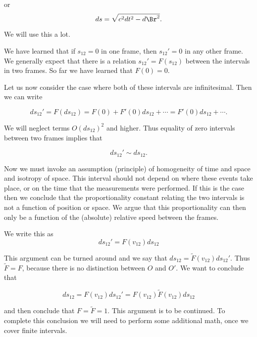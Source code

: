 or
\begin{equation}\label{eqn:relativisticElectrodynamicsL2:60b}
ds= \sqrt{c^2 dt^2 - d\Br^2}.
\end{equation}

We will use this a lot.

We have learned that if \(s_{12} = 0\) in one frame, then \(s_{12}' = 0\) in any other frame.  We generally expect that there is a relation \(s_{12}' = F(s_12)\) between the intervals in two frames.  So far we have learned that \(F(0) = 0\). 

Let us now consider the case where both of these intervals are infinitesimal.  Then we can write

\begin{equation}\label{eqn:relativisticElectrodynamicsL2:70}
ds_{12}' = F(ds_{12}) = F(0) + F'(0) ds_{12} + \cdots = F'(0) ds_{12} + \cdots.
\end{equation}

We will neglect terms \(O(ds_{12})^2\) and higher.  Thus equality of zero intervals between two frames implies that 

\begin{equation}\label{eqn:relativisticElectrodynamicsL2:80}
ds_{12}' \sim ds_{12}.
\end{equation}

Now we must invoke an assumption (principle) of homogeneity of time and space and isotropy of space.  This interval should not depend on where these events take place, or on the time that the measurements were performed.  If this is the case then we conclude that the proportionality constant relating the two intervals is not a function of position or space.  We argue that this proportionality can then only be a function of the (absolute) relative speed between the frames.

We write this as
\begin{equation}\label{eqn:relativisticElectrodynamicsL2:90}
ds_{12}' = F(v_{12}) ds_{12}
\end{equation}

This argument can be turned around and we say that \(ds_{12} = \tilde{F}(v_{12}) ds_{12}'\).  Thus \(\tilde{F} = F\), because there is no distinction between \(O\) and \(O'\).  We want to conclude that 

\begin{equation}\label{eqn:relativisticElectrodynamicsL2:100}
ds_{12} = F(v_{12}) ds_{12}' = F(v_{12}) \tilde{F}(v_{12}) ds_{12}
\end{equation}

and then conclude that \(F = \tilde{F} = 1\).  This argument is to be continued.  To complete this conclusion we will need to perform some additional math, once we cover finite intervals.
